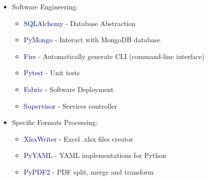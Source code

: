 \begin{frame}[allowframebreaks]
\begin{itemize}
      \item Software Engineering:
      \begin{itemize}
         \item \textcolor{DarkBlue}{SQLAlchemy} - Database Abstraction
         \item \textcolor{DarkBlue}{PyMongo} - Interact with MongoDB database
         \item \textcolor{DarkBlue}{Fire} - Automatically generate CLI (command-line interface)
         \item \textcolor{DarkBlue}{Pytest} - Unit tests
         \item \textcolor{DarkBlue}{Fabric} - Software Deployment
         \item \textcolor{DarkBlue}{Supervisor} - Services controller
      \end{itemize}
      \vspace{0.3em}

      \item Specific Formats Processing:
      \begin{itemize}
         \item \textcolor{DarkBlue}{XlsxWriter} - Excel .xlsx files creator
         \item \textcolor{DarkBlue}{PyYAML} - YAML implementations for Python
         \item \textcolor{DarkBlue}{PyPDF2} - PDF split, merge and transform
      \end{itemize}
      \vspace{0.3em}

   \end{itemize}
\end{frame}



